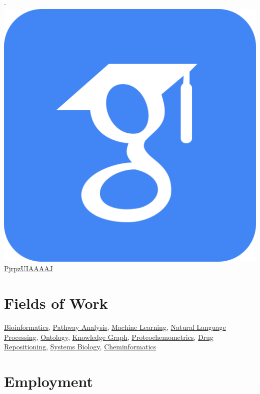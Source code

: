 \documentclass[10pt,a4paper,sans]{moderncv} %
\newcommand{\wikidata}[2]{\href{https://bioregistry.io/wikidata:#1?provider=scholia}{{#2}}}
\begin{document}
$\cdot$
\href{https://scholar.google.com/citations?user=PjrpzUIAAAAJ}{\includegraphics[scale=0.015625]{img/google_scholar_icon_130918} PjrpzUIAAAAJ}

\section{Fields of Work}\label{sec:fields}

    \wikidata{Q128570}{Bioinformatics},     \wikidata{Q25303877}{Pathway Analysis},     \wikidata{Q2539}{Machine Learning},     \wikidata{Q30642}{Natural Language Processing},     \wikidata{Q324254}{Ontology},     \wikidata{Q33002955}{Knowledge Graph},     \wikidata{Q50327360}{Proteochemometrics},     \wikidata{Q5308921}{Drug Repositioning},     \wikidata{Q815297}{Systems Biology},     \wikidata{Q910164}{Cheminformatics}

\section{Employment}\label{sec:employment}
\end{document}
